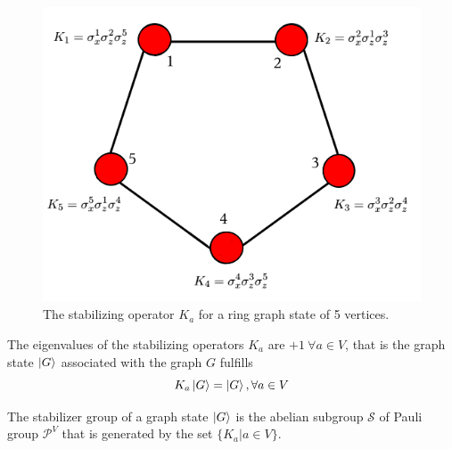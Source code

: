 \documentclass[10pt,a4paper]{book}
\numberwithin{equation}{chapter}
\numberwithin{figure}{chapter}
\numberwithin{table}{chapter}
\begin{document}
\begin{figure}[H]
    \begin{center}
        \includegraphics[scale=0.5]{graphstate2.png}
    \end{center}
    \caption{\footnotesize The stabilizing operator $K_a$ for a ring graph state of 5 vertices.}
    \label{gs2}
\end{figure}

The eigenvalues of the stabilizing operators $K_a$ are $+1 \ \forall a \in V$, that is the graph state $\ket{G}$ associated with the graph $G$ fulfills
\begin{equation}
K_{a}\ket{G}=\ket{G}, \forall a \in V 
\end{equation}
  
The stabilizer group of a graph state $\ket{G}$ is the abelian subgroup $\mathcal{S}$ of Pauli group $\mathcal{P}^V$ that is generated by the set $\lbrace K_{a} | a \in V \rbrace$.  
\end{document}
